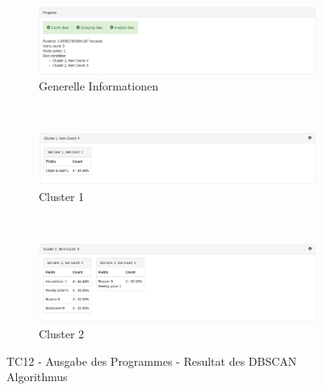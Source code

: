 \begin{figure}[H]
	\begin{subfigure}[t]{1\textwidth}
		\centering
		\includegraphics[width=1\textwidth]{images/tc12-dbscan-1}
		\caption{Generelle Informationen}
		\label{fig:testingfazit:testing:testcases:12-1-1}
	\end{subfigure} \\
	\begin{subfigure}[t]{1\textwidth}
		\centering
		\includegraphics[width=1\textwidth]{images/tc12-dbscan-2}
		\caption{Cluster 1}
		\label{fig:testingfazit:testing:testcases:12-1-2}
	\end{subfigure}\\
	\begin{subfigure}[t]{1\textwidth}
		\centering
		\includegraphics[width=1\textwidth]{images/tc12-dbscan-3}
		\caption{Cluster 2}
		\label{fig:testingfazit:testing:testcases:12-1-3}
	\end{subfigure}
	\caption{TC12 - Ausgabe des Programmes - Resultat des DBSCAN Algorithmus}
	\label{fig:testingfazit:testing:testcases:12-1}
\end{figure}

